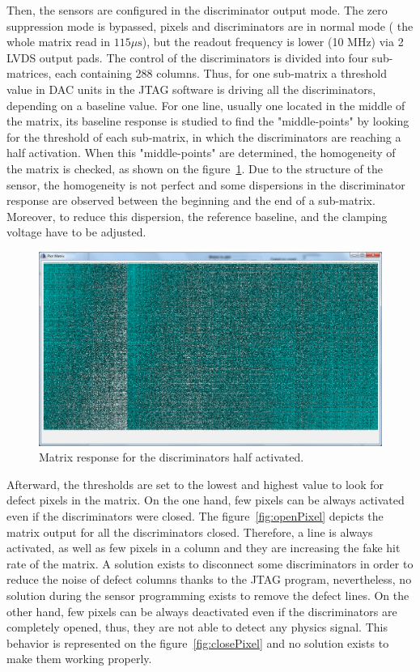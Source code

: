   Then, the sensors are configured in the discriminator output mode.
  The zero suppression mode is bypassed, pixels and discriminators are in normal mode ( the whole matrix read in $115\mu\text{s}$), but the readout frequency is lower (10 MHz) via 2 LVDS output pads.
  The control of the discriminators is divided into four sub-matrices, each containing 288 columns.
  Thus, for one sub-matrix a threshold value in DAC units in the JTAG software is driving all the discriminators, depending on a baseline value.
  For one line, usually one located in the middle of the matrix, its baseline response is studied to find the "middle-points" by looking for the threshold of each sub-matrix, in which the discriminators are reaching a half activation.
  When this "middle-points" are determined, the homogeneity of the matrix is checked, as shown on the figure~\ref{fig:homogeneityMi26}.
  Due to the structure of the sensor, the homogeneity is not perfect and some dispersions in the discriminator response are observed between the beginning and the end of a sub-matrix.
  Moreover, to reduce this dispersion, the reference baseline, and the clamping voltage have to be adjusted.
  
  \begin{figure}[!h]
    \centering
    \includegraphics[width = \textwidth]{Pictures/labTests/discri_middle.png}
    \caption{Matrix response for the discriminators half activated.}
    \label{fig:homogeneityMi26}
  \end{figure}
  
  Afterward, the thresholds are set to the lowest and highest value to look for defect pixels in the matrix.
  On the one hand, few pixels can be always activated even if the discriminators were closed.
  The figure~\ref{fig:openPixel} depicts the matrix output for all the discriminators closed.
  Therefore, a line is always activated, as well as few pixels in a column and they are increasing the fake hit rate of the matrix.
  A solution exists to disconnect some discriminators in order to reduce the noise of defect columns thanks to the JTAG program, nevertheless, no solution during the sensor programming exists to remove the defect lines.
  On the other hand, few pixels can be always deactivated even if the discriminators are completely opened, thus, they are not able to detect any physics signal.
  This behavior is represented on the figure~\ref{fig:closePixel} and no solution exists to make them working properly.
   
